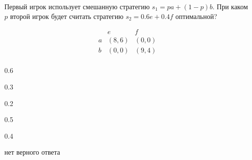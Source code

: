 
\begin{question}
Первый игрок использует смешанную стратегию \(s_1 = p a + (1-p)b\).
При каком \(p\) второй игрок будет считать стратегию \(s_2 = 0.6 e + 0.4 f\) оптимальной?

\[
\begin{matrix}
   & e & f \\
a  & (8, 6) & (0, 0) \\
b  & (0, 0) & (9, 4) \\
\end{matrix}
\]
\begin{answerlist}
  \item 0.6
  \item 0.3
  \item 0.2
  \item 0.5
  \item 0.4
  \item нет верного ответа
\end{answerlist}
\end{question}


